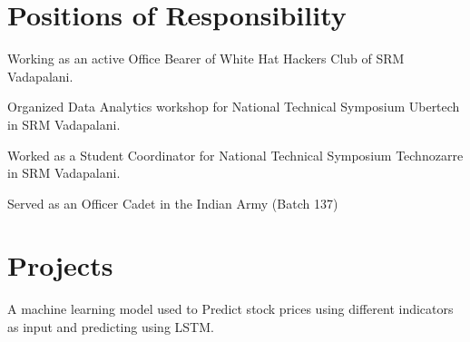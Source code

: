 \documentclass[]{surya-resume}
\begin{document}
\begin{minipage}[t]{1\textwidth} 

\section{Positions of Responsibility}
\vspace{\topsep} %
\begin{tightemize}
\item Working as an active Office Bearer of White Hat Hackers Club of SRM Vadapalani.
\end{tightemize}
\sectionsep

\begin{tightemize}
\item Organized Data Analytics workshop for National Technical Symposium Ubertech in SRM Vadapalani.
\end{tightemize}
\sectionsep

\begin{tightemize}
\item Worked as a Student Coordinator for National Technical Symposium Technozarre in SRM Vadapalani.
\end{tightemize}
\sectionsep
{}
\begin{tightemize}
\item Served as an Officer Cadet in the Indian Army (Batch 137)
\end{tightemize}
\sectionsep

\section{Projects}
A machine learning model used to Predict stock prices using different indicators as input and predicting using LSTM.
\sectionsep


\end{minipage}
\end{document}
